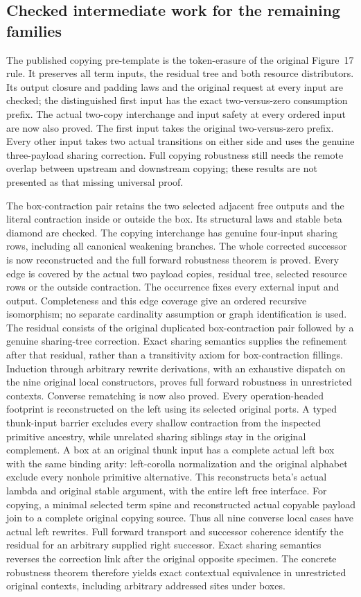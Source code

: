 \subsection{Checked intermediate work for the remaining families}
The published copying pre-template is the token-erasure of the original
Figure~17 rule. It preserves all term inputs, the residual tree and both
resource distributors. Its output closure and padding laws and the
original request at every input are checked; the distinguished first input
has the exact two-versus-zero consumption prefix. The actual two-copy interchange and input safety at every ordered input
are now also proved. The first input takes the original two-versus-zero
prefix. Every other input takes two actual transitions on either side and
uses the genuine three-payload sharing correction. Full copying robustness
still needs the remote overlap between upstream and downstream copying;
these results are not presented as that missing universal proof.

The box-contraction pair retains the two selected adjacent free outputs and
the literal contraction inside or outside the box. Its structural laws and
stable beta diamond are checked. The copying interchange has genuine
four-input sharing rows, including all canonical weakening branches.
The whole corrected successor is now reconstructed and the full forward
robustness theorem is proved. Every edge is covered by the actual two payload
copies, residual tree, selected resource rows or the outside contraction.
The occurrence fixes every external input and output. Completeness and this
edge coverage give an ordered recursive isomorphism; no separate cardinality
assumption or graph identification is used. The residual consists of the
original duplicated box-contraction pair followed by a genuine sharing-tree
correction. Exact sharing semantics supplies the refinement after that
residual, rather than a transitivity axiom for box-contraction fillings.
Induction through arbitrary rewrite derivations, with an exhaustive dispatch
on the nine original local constructors, proves full forward robustness in
unrestricted contexts. Converse rematching is now also proved. Every operation-headed footprint
is reconstructed on the left using its selected original ports. A typed
thunk-input barrier excludes every shallow contraction from the inspected
primitive ancestry, while unrelated sharing siblings stay in the original
complement. A box at an original thunk input has a complete actual left
box with the same binding arity: left-corolla normalization and the original
alphabet exclude every nonhole primitive alternative. This reconstructs
beta's actual lambda and original stable argument, with the entire left
free interface. For copying, a minimal selected term spine and reconstructed
actual copyable payload join to a complete original copying source. Thus
all nine converse local cases have actual left rewrites. Full forward
transport and successor coherence identify the residual for an arbitrary
supplied right successor. Exact sharing semantics reverses the correction
link after the original opposite specimen. The concrete robustness theorem
therefore yields exact contextual equivalence in unrestricted original
contexts, including arbitrary addressed sites under boxes.

